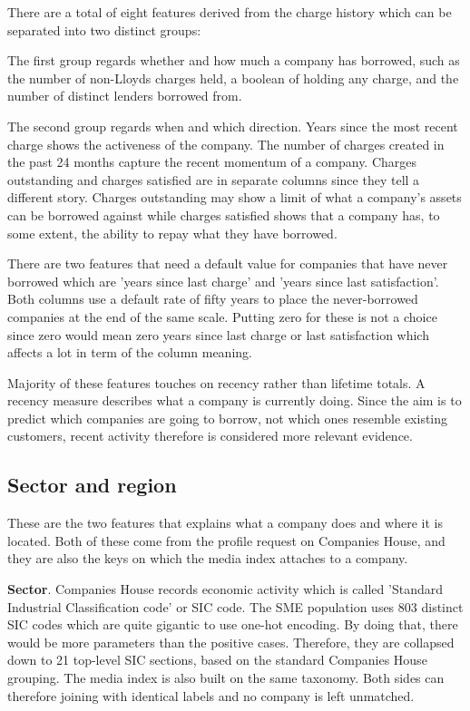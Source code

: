 \documentclass[ %
                    author={Natchalin Iwsakul \\[0.4em] Inkaphol Siriwongwattana \\[0.4em] Tanaphan Kummaraphat \\[0.6em] Patorn Srisupap},,
                supervisor={Fernando Moreno-Pino},
                    degree={MSc},
                     title={Propensity Modelling for SME Commercial Lending Using Open Public Data
},
                  subtitle={Companies House and GDELT as predictors of first-time borrowing},
                      type={},
                      year={2026}]{dissertation}
\begin{document}
  There are a total of eight features derived from the charge history which can be separated into two distinct groups:

  The first group regards whether and how much a company has borrowed, such as the number of non-Lloyds charges held, a boolean of holding any charge, and the number of distinct lenders borrowed from.

  The second group regards when and which direction. Years since the most recent charge shows the activeness of the company. The number of charges created in the past 24 months capture the recent momentum of a company. Charges outstanding and charges satisfied are in separate columns since they tell a different story. Charges outstanding may show a limit of what a company's assets can be borrowed against while charges satisfied shows that a company has, to some extent, the ability to repay what they have borrowed.

  There are two features that need a default value for companies that have never borrowed which are 'years since last charge' and 'years since last satisfaction'. Both columns use a default rate of fifty years to place the never-borrowed companies at the end of the same scale. Putting zero for these is not a choice since zero would mean zero years since last charge or last satisfaction which affects a lot in term of the column meaning.

  Majority of these features touches on recency rather than lifetime totals. A recency measure describes what a company is currently doing. Since the aim is to predict which companies are going to borrow, not which ones resemble existing customers, recent activity therefore is considered more relevant evidence.
  
  \subsection{Sector and region}
  These are the two features that explains what a company does and where it is located. Both of these come from the profile request on Companies House, and they are also the keys on which the media index attaches to a company.

  \textbf{Sector}. Companies House records economic activity which is called 'Standard Industrial Classification code' or SIC code. The SME population uses 803 distinct SIC codes which are quite gigantic to use one-hot encoding. By doing that, there would be more parameters than the positive cases. Therefore, they are collapsed down to 21 top-level SIC sections, based on the standard Companies House grouping. The media index is also built on the same taxonomy. Both sides can therefore joining with identical labels and no company is left unmatched.
\end{document}
